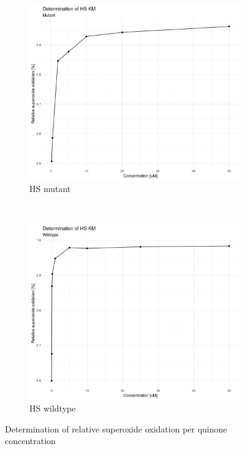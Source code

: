 \begin{figure}
    \centering
    \begin{subfigure}{0.45\textwidth}
	\includegraphics[width=\textwidth]{img/activity_mut_km.png}
	\caption{HS mutant}
	\label{fig:activity_mut_km}
    \end{subfigure}
    ~
    \begin{subfigure}{0.45\textwidth}
	\includegraphics[width=\textwidth]{img/activity_wt_km.png}
	\caption{HS wildtype}
	\label{fig:activity_wt_km}
    \end{subfigure}
    \caption{Determination of relative superoxide oxidation per quinone concentration}
    \label{fig:activity_km}
\end{figure}

